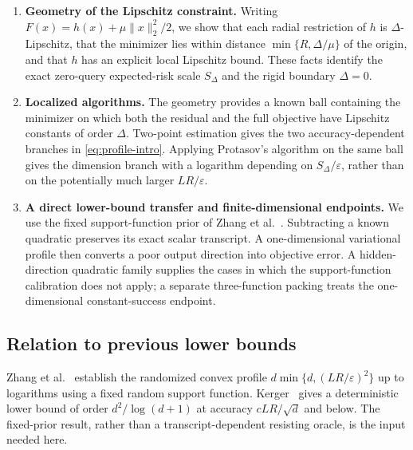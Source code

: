 \documentclass[11pt]{article}
\newcommand{\eps}{\varepsilon}
\theoremstyle{plain}
\theoremstyle{definition}
\begin{document}
\begin{enumerate}[label=(\roman*),leftmargin=2.2em]
\item \textbf{Geometry of the Lipschitz constraint.}
Writing $F(x)=h(x)+\mu\|x\|_2^2/2$, we show that each radial restriction
of $h$ is $\Delta$-Lipschitz, that the minimizer lies within distance
$\min\{R,\Delta/\mu\}$ of the origin, and that $h$ has an explicit
local Lipschitz bound. These facts identify the exact zero-query
expected-risk scale $S_\Delta$ and the rigid boundary $\Delta=0$.

\item \textbf{Localized algorithms.}
The geometry provides a known ball containing the minimizer on which
both the residual and the full objective have Lipschitz constants of
order $\Delta$. Two-point estimation gives the two accuracy-dependent
branches in \eqref{eq:profile-intro}. Applying Protasov's algorithm on
the same ball gives the dimension branch with a logarithm depending on
$S_\Delta/\eps$, rather than on the potentially much larger $LR/\eps$.

\item \textbf{A direct lower-bound transfer and finite-dimensional endpoints.}
We use the fixed support-function prior of Zhang et
al.~\cite[Theorem~5]{ZhangEtAl2026}. Subtracting a known quadratic
preserves its exact scalar transcript. A one-dimensional variational
profile then converts a poor output direction into objective error.
A hidden-direction quadratic family supplies the cases in which the
support-function calibration does not apply; a separate three-function
packing treats the one-dimensional constant-success endpoint.
\end{enumerate}

\subsection{Relation to previous lower bounds}\label{sec:related}

Zhang et al.~\cite{ZhangEtAl2026} establish the randomized convex
profile $d\min\{d,(LR/\eps)^2\}$ up to logarithms using a fixed random
support function. Kerger~\cite[Theorem~4]{Kerger2026} gives a
deterministic lower bound of order $d^2/\log(d+1)$ at accuracy
$cLR/\sqrt d$ and below. The fixed-prior result, rather than a
transcript-dependent resisting oracle, is the input needed here.
\end{document}
